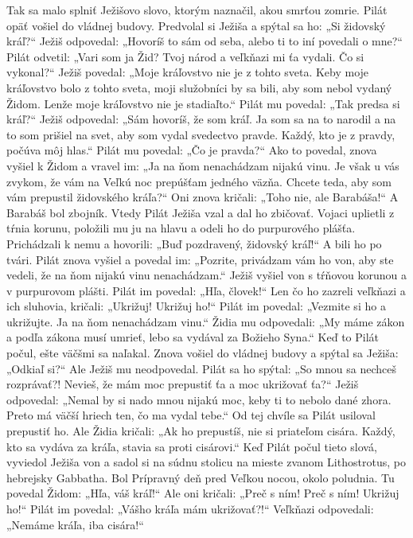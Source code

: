 Tak sa malo splniť Ježišovo slovo, ktorým naznačil, akou smrťou zomrie.
Pilát opäť vošiel do vládnej budovy. Predvolal si Ježiša a spýtal sa ho: „Si židovský kráľ?“ Ježiš odpovedal: „Hovoríš to sám od seba, alebo ti to iní povedali o mne?“ Pilát odvetil: „Vari som ja Žid? Tvoj národ a veľkňazi mi ťa vydali. Čo si vykonal?“ Ježiš povedal: „Moje kráľovstvo nie je z tohto sveta. Keby moje kráľovstvo bolo z tohto sveta, moji služobníci by sa bili, aby som nebol vydaný Židom. Lenže moje kráľovstvo nie je stadiaľto.“ Pilát mu povedal: „Tak predsa si kráľ?“ Ježiš odpovedal: „Sám hovoríš, že som kráľ. Ja som sa na to narodil a na to som prišiel na svet, aby som vydal svedectvo pravde. Každý, kto je z pravdy, počúva môj hlas.“ Pilát mu povedal: „Čo je pravda?“ Ako to povedal, znova vyšiel k Židom a vravel im: „Ja na ňom nenachádzam nijakú vinu. Je však u vás zvykom, že vám na Veľkú noc prepúšťam jedného väzňa. Chcete teda, aby som vám prepustil židovského kráľa?“ Oni znova kričali: „Toho nie, ale Barabáša!“ A Barabáš bol zbojník.
\versseparator
Vtedy Pilát Ježiša vzal a dal ho zbičovať. Vojaci uplietli z tŕnia korunu, položili mu ju na hlavu a odeli ho do purpurového plášťa. Prichádzali k nemu a hovorili: „Buď pozdravený, židovský kráľ!“ A bili ho po tvári. Pilát znova vyšiel a povedal im: „Pozrite, privádzam vám ho von, aby ste vedeli, že na ňom nijakú vinu nenachádzam.“ Ježiš vyšiel von s tŕňovou korunou a v purpurovom plášti. Pilát im povedal: „Hľa, človek!“ Len čo ho zazreli veľkňazi a ich sluhovia, kričali: „Ukrižuj! Ukrižuj ho!“ Pilát im povedal: „Vezmite si ho a ukrižujte. Ja na ňom nenachádzam vinu.“ 
Židia mu odpovedali: „My máme zákon a podľa zákona musí umrieť, lebo sa vydával za Božieho Syna.“
Keď to Pilát počul, ešte väčšmi sa naľakal. Znova vošiel do vládnej budovy a spýtal sa Ježiša: „Odkiaľ si?“ Ale Ježiš mu neodpovedal. Pilát sa ho spýtal: „So mnou sa nechceš rozprávať?! Nevieš, že mám moc prepustiť ťa a moc ukrižovať ťa?“ 
Ježiš odpovedal: „Nemal by si nado mnou nijakú moc, keby ti to nebolo dané zhora. Preto má väčší hriech ten, čo ma vydal tebe.“
\versseparator
Od tej chvíle sa Pilát usiloval prepustiť ho. Ale Židia kričali: „Ak ho prepustíš, nie si priateľom cisára. Každý, kto sa vydáva za kráľa, stavia sa proti cisárovi.“ Keď Pilát počul tieto slová, vyviedol Ježiša von a sadol si na súdnu stolicu na mieste zvanom Lithostrotus, po hebrejsky Gabbatha. Bol Prípravný deň pred Veľkou nocou, okolo poludnia. Tu povedal Židom: „Hľa, váš kráľ!“ Ale oni kričali: „Preč s ním! Preč s ním! Ukrižuj ho!“ Pilát im povedal: „Vášho kráľa mám ukrižovať?!“ Veľkňazi odpovedali: „Nemáme kráľa, iba cisára!“ 
